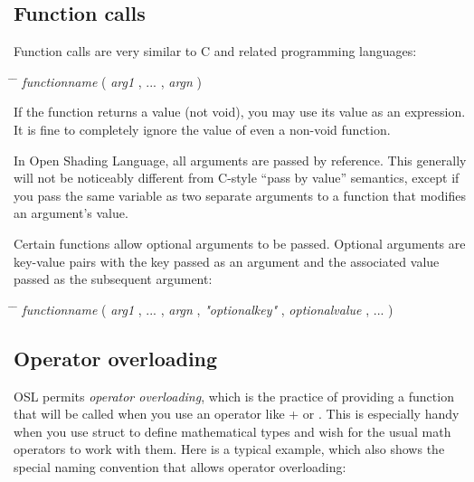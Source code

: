 \documentclass[11pt,letterpaper]{book}
\def\langname{Open Shading Language\xspace}
\def\void{{\cf void}\xspace}
\begin{document}
\subsection{Function calls}
\label{sec:syntax:functioncalls}

Function calls are very similar to C and related programming languages:

\begin{tabbing}
\hspace{0.5in} \= \hspace{0.3in} \= \kill
\> \emph{functionname} {\cf (} \emph{arg1} {\cf ,} ... {\cf ,} \emph{argn} {\cf )} \\
\end{tabbing}

If the function returns a value (not \void), you may use its value as
an expression.  It is fine to completely ignore the value of even
a non-\void function.

In \langname, all arguments are passed by reference.  This generally
will not be noticeably different from C-style ``pass by value''
semantics, except if you pass the same variable as two separate
arguments to a function that modifies an argument's value.

Certain functions allow optional arguments to be passed.  
Optional arguments are key-value pairs with the key passed as an 
argument and the associated value passed as the subsequent argument:

\begin{tabbing}
\hspace{0.5in} \= \hspace{0.3in} \= \kill
\> \emph{functionname} {\cf (} \emph{arg1} {\cf ,} ... {\cf ,} \emph{argn}  {\cf ,} \emph{"optionalkey"}  {\cf ,} \emph{optionalvalue} {\cf ,} ... {\cf )} \\
\end{tabbing}

\subsection{Operator overloading}
\label{sec:syntax:operatoroverloading}

OSL permits \emph{operator overloading}, which is the practice of providing
a function that will be called when you use an operator like {\cf +} or
{\cf *}. This is especially handy when you use {\cf struct} to define
mathematical types and wish for the usual math operators to work with them.
Here is a typical example, which also shows the special naming convention
that allows operator overloading:
\end{document}
